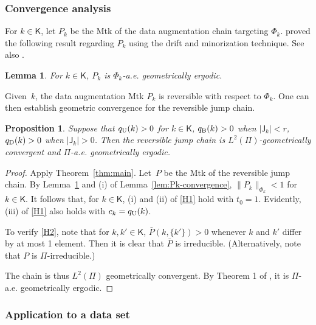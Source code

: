 \documentclass[12pt]{article}
\newtheorem{lemma}[theorem]{Lemma}
\newtheorem{proposition}[theorem]{Proposition}
\begin{document}
\subsubsection{Convergence analysis}



For $k \in \mathsf{K}$, let $P_k$ be the Mtk of the data augmentation chain targeting $\Phi_k$.
\cite{chakraborty2016convergence} proved the following result regarding $P_k$ using the drift and minorization technique.
See also \cite{roy2007convergence}.

\begin{lemma} \label{lem:acgeo}
	For $k \in \mathsf{K}$, $P_k$ is $\Phi_k$-a.e. geometrically ergodic.
\end{lemma}

Given~$k$, the data augmentation Mtk $P_k$ is reversible with respect to $\Phi_k$.
One can then establish geometric convergence for the reversible jump chain.

\begin{proposition} \label{pro:acgeo}
	Suppose that $q_{\scriptsize\mbox{U}}(k) > 0$ for $k \in \mathsf{K}$, $q_{\scriptsize\mbox{B}}(k) > 0$ when $|\mathsf{J}_k| < r$, $q_{\scriptsize\mbox{D}}(k) > 0$ when $|\mathsf{J}_k| > 0$.
	Then the reversible jump chain is $L^2(\Pi)$-geometrically convergent and $\Pi$-a.e. geometrically ergodic.
\end{proposition}

\begin{proof}
	Apply Theorem~\ref{thm:main}.
	Let~$P$ be the Mtk of the reversible jump chain.
	By Lemma~\ref{lem:acgeo} and (i) of Lemma~\ref{lem:Pk-convergence}, $\|P_k\|_{\Phi_k} < 1$ for $k \in \mathsf{K}$.
	It follows that, for $k \in \mathsf{K}$, (i) and (ii) of \ref{H1} hold with $t_0 = 1$.
	Evidently, (iii) of \ref{H1} also holds with $c_k = q_{\scriptsize\mbox{U}}(k)$.
	
	To verify \ref{H2}, note that for $k,k' \in \mathsf{K}$, $\bar{P}(k,\{k'\}) > 0$ whenever $k$ and $k'$ differ by at most 1 element.
	Then it is clear that $\bar{P}$ is irreducible.
	(Alternatively, note that $P$ is $\Pi$-irreducible.)
	
	
	The chain is thus $L^2(\Pi)$ geometrically convergent.
	By Theorem 1 of \cite{roberts2001geometric}, it is $\Pi$-a.e. geometrically ergodic.
\end{proof}

\subsubsection{Application to a data set} \label{sssec:binary-example}
\end{document}
